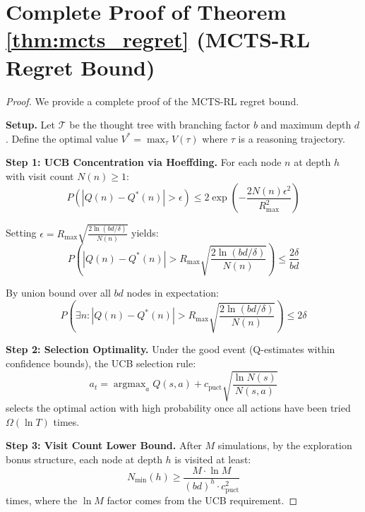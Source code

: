 \documentclass[11pt,a4paper]{article}
\newcommand{\argmax}{\operatorname{argmax}}
\newcommand{\calT}{\mathcal{T}}
\begin{document}

\appendix

\section{Complete Proof of Theorem \ref{thm:mcts_regret} (MCTS-RL Regret Bound)}

\begin{proof}
We provide a complete proof of the MCTS-RL regret bound.

\textbf{Setup.} Let $\calT$ be the thought tree with branching factor $b$ and maximum depth $d$. Define the optimal value $V^* = \max_\tau V(\tau)$ where $\tau$ is a reasoning trajectory.

\textbf{Step 1: UCB Concentration via Hoeffding.} For each node $n$ at depth $h$ with visit count $N(n) \geq 1$:
\begin{equation}
    P\left(\left|Q(n) - Q^*(n)\right| > \epsilon\right) \leq 2\exp\left(-\frac{2N(n)\epsilon^2}{R_{\max}^2}\right)
\end{equation}

Setting $\epsilon = R_{\max}\sqrt{\frac{2\ln(bd/\delta)}{N(n)}}$ yields:
\begin{equation}
    P\left(\left|Q(n) - Q^*(n)\right| > R_{\max}\sqrt{\frac{2\ln(bd/\delta)}{N(n)}}\right) \leq \frac{2\delta}{bd}
\end{equation}

By union bound over all $bd$ nodes in expectation:
\begin{equation}
    P\left(\exists n: \left|Q(n) - Q^*(n)\right| > R_{\max}\sqrt{\frac{2\ln(bd/\delta)}{N(n)}}\right) \leq 2\delta
\end{equation}

\textbf{Step 2: Selection Optimality.} Under the good event (Q-estimates within confidence bounds), the UCB selection rule:
\begin{equation}
    a_t = \argmax_a Q(s, a) + c_{\text{puct}} \sqrt{\frac{\ln N(s)}{N(s,a)}}
\end{equation}
selects the optimal action with high probability once all actions have been tried $\Omega(\ln T)$ times.

\textbf{Step 3: Visit Count Lower Bound.} After $M$ simulations, by the exploration bonus structure, each node at depth $h$ is visited at least:
\begin{equation}
    N_{\min}(h) \geq \frac{M \cdot \ln M}{(bd)^h \cdot c_{\text{puct}}^2}
\end{equation}
times, where the $\ln M$ factor comes from the UCB requirement.


\end{proof}
\end{document}
